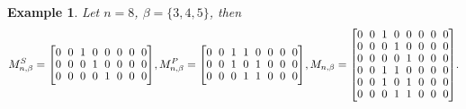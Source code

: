 \documentclass[10pt,a4paper]{amsart}
\newtheorem{example}{Example}[section]
\begin{document}
\begin{example}
   Let $n=8$, $\beta=\{3,4,5\}$, then 
   \[M_{n,\beta}^S=
   {
   \renewcommand{\arraystretch}{0.9} 
   \setlength{\arraycolsep}{3pt}
   \begin{bmatrix}
   0 & 0 & 1 & 0 & 0 & 0 & 0 & 0  \\
   0 & 0 & 0 & 1 & 0 & 0 & 0 & 0  \\
   0 & 0 & 0 & 0 & 1 & 0 & 0 & 0  \\
   \end{bmatrix} 
   }
   , M_{n,\beta}^P=
   {
   \renewcommand{\arraystretch}{0.9} 
   \setlength{\arraycolsep}{3pt}\begin{bmatrix}
   0 & 0 & 1 & 1 & 0 & 0 & 0 & 0 \\
   0 & 0 & 1 & 0 & 1 & 0 & 0 & 0 \\
   0 & 0 & 0 & 1 & 1 & 0 & 0 & 0 
   \end{bmatrix}
   }, M_{n,\beta}=
   {
   \renewcommand{\arraystretch}{0.9}
   \setlength{\arraycolsep}{3pt}
   \begin{bmatrix}
   0 & 0 & 1 & 0 & 0 & 0 & 0 & 0 \\
   0 & 0 & 0 & 1 & 0 & 0 & 0 & 0 \\
   0 & 0 & 0 & 0 & 1 & 0 & 0 & 0 \\
   0 & 0 & 1 & 1 & 0 & 0 & 0 & 0 \\
   0 & 0 & 1 & 0 & 1 & 0 & 0 & 0 \\
   0 & 0 & 0 & 1 & 1 & 0 & 0 & 0 
   \end{bmatrix}
   }.
   \]
\end{example}
\end{document}
